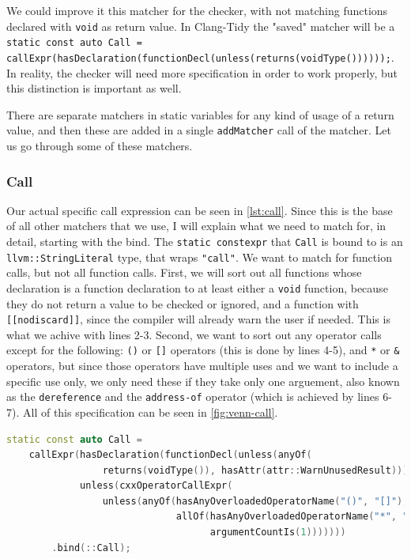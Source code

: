 We could improve it this matcher for the checker, with not matching functions declared with \lstinline{void} as return value.
In Clang-Tidy the "saved" matcher will be a
\lstinline{static const auto Call = callExpr(hasDeclaration(functionDecl(unless(returns(voidType())))));}. In reality, the
checker will need more specification in order to work properly, but this distinction is important as well.

There are separate matchers in static variables for any kind of usage of a return value, and then these are added in a single
\texttt{addMatcher} call of the matcher. Let us go through some of these matchers.

\subsubsection{Call}

Our actual specific call expression can be seen in \cref{lst:call}. Since this is the base of all other matchers
that we use, I will explain what we need to match for, in detail, starting with the bind. The \lstinline{static constexpr} that \texttt{Call}
is bound to is an \lstinline{llvm::StringLiteral} type, that wraps \texttt{"call"}.
We want to match for function calls, but not all function calls. First, we will sort out all functions whose declaration is a function
declaration to at least either a \lstinline{void} function, because they do not return a value to be checked or ignored, and a
function with \texttt{[[nodiscard]]}, since the compiler will already warn the user if needed. This is what we achive with lines
2-3. Second, we want to sort out any operator calls except for the following: \lstinline{()} or \lstinline{[]} operators
(this is done by lines 4-5), and \lstinline{*} or \lstinline{&} operators, but since those operators have multiple uses and
we want to include a specific use only, we only need these if they take only one arguement, also known as the \texttt{dereference}
and the \texttt{address-of} operator (which is achieved by lines 6-7).
All of this specification can be seen in \cref{fig:venn-call}.


\begin{lstlisting}[language={C++},caption={The matcher for our desired call expression.},label={lst:call}]
static const auto Call =
	callExpr(hasDeclaration(functionDecl(unless(anyOf(
				 returns(voidType()), hasAttr(attr::WarnUnusedResult))))),
			 unless(cxxOperatorCallExpr(
				 unless(anyOf(hasAnyOverloadedOperatorName("()", "[]"),
							  allOf(hasAnyOverloadedOperatorName("*", "&"),
									argumentCountIs(1)))))))
		.bind(::Call);
\end{lstlisting}

